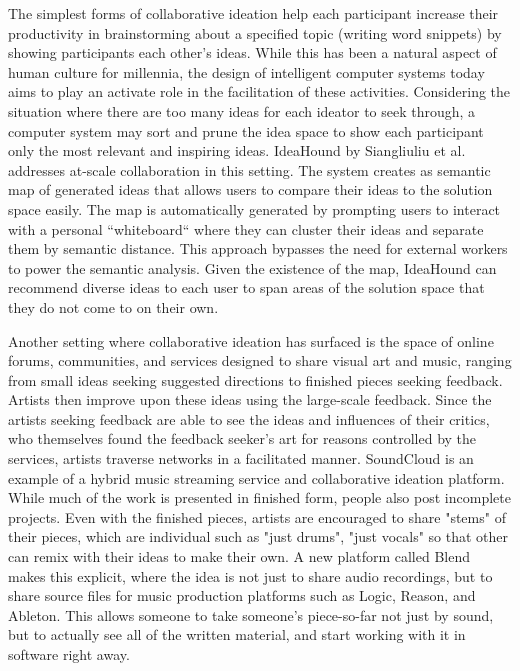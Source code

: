 \documentclass[final,authoryear,11pt,times]{elsarticle}
\begin{document}
The simplest forms of collaborative ideation help each participant increase their productivity in brainstorming about a specified topic (writing word snippets) by showing participants each other's ideas. While this has been a natural aspect of human culture for millennia, the design of intelligent computer systems today aims to play an activate role in the facilitation of these activities. Considering the situation where there are too many ideas for each ideator to seek through, a computer system may sort and prune the idea space to show each participant only the most relevant and inspiring ideas. IdeaHound by Siangliuliu et al. addresses at-scale collaboration in this setting. The system creates as semantic map of generated ideas that allows users to compare their ideas to the solution space easily. The map is automatically generated by prompting users to interact with a personal ``whiteboard`` where they can cluster their ideas and separate them by semantic distance. This approach bypasses the need for external workers to power the semantic analysis. Given the existence of the map, IdeaHound can recommend diverse ideas to each user to span areas of the solution space that they do not come to on their own.

Another setting where collaborative ideation has surfaced is the space of online forums, communities, and services designed to share visual art and music, ranging from small ideas seeking suggested directions to finished pieces seeking feedback. Artists then improve upon these ideas using the large-scale feedback. Since the artists seeking feedback are able to see the ideas and influences of their critics, who themselves found the feedback seeker's art for reasons controlled by the services, artists traverse networks in a facilitated manner. SoundCloud is an example of a hybrid music streaming service and collaborative ideation platform. While much of the work is presented in finished form, people also post incomplete projects. Even with the finished pieces, artists are encouraged to share "stems" of their pieces, which are individual such as "just drums", "just vocals" so that other can remix with their ideas to make their own. A new platform called Blend makes this explicit, where the idea is not just to share audio recordings, but to share source files for music production platforms such as Logic, Reason, and Ableton. This allows someone to take someone's piece-so-far not just by sound, but to actually see all of the written material, and start working with it in software right away.
\end{document}
